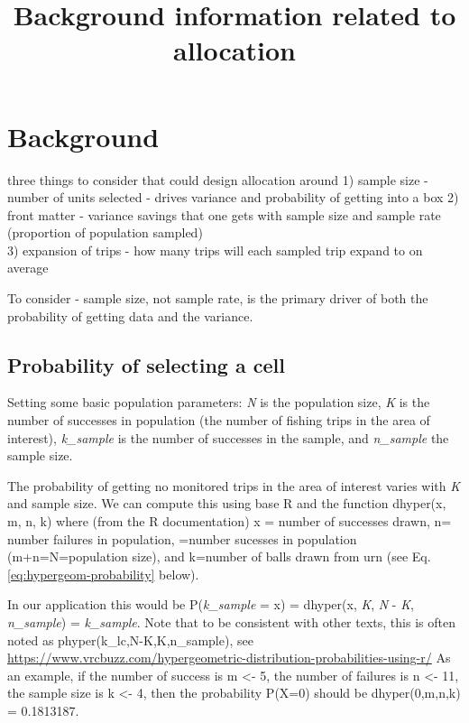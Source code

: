 \documentclass[
]{article}
\title{Background information related to allocation}
\author{}
\date{\vspace{-2.5em}}
\begin{document}
\maketitle

{
\setcounter{tocdepth}{2}
\tableofcontents
}
\hypertarget{background}{%
\section{Background}\label{background}}

three things to consider that could design allocation around
1) sample size - number of units selected - drives variance and probability of
getting into a box
2) front matter - variance savings that one gets with sample size and sample
rate (proportion of population sampled)\\
3) expansion of trips - how many trips will each sampled trip expand to on
average

To consider -
sample size, not sample rate, is the primary driver of both the probability of
getting data and the variance.

\hypertarget{probability-of-selecting-a-cell}{%
\subsection{Probability of selecting a cell}\label{probability-of-selecting-a-cell}}

Setting some basic population parameters: \emph{N} is the population size, \emph{K}
is the number of successes in population (the number of fishing trips in the
area of interest), \emph{k\_sample} is the number of successes in the sample, and
\emph{n\_sample} the sample size.

The probability of getting no monitored trips in the area of interest varies
with \emph{K} and sample size. We can compute this using base R and the function
dhyper(x, m, n, k) where (from the R documentation) x = number of successes
drawn, n= number failures in population, =number sucesses in population
(m+n=N=population size), and k=number of balls drawn from urn (see Eq.
\eqref{eq:hypergeom-probability} below).

In our application this would be P(\emph{k\_sample} = x) = dhyper(x, \emph{K}, \emph{N} - \emph{K},
\emph{n\_sample}) = \emph{k\_sample}. Note that to be consistent with other texts, this
is often noted as phyper(k\_lc,N-K,K,n\_sample),
see \url{https://www.vrcbuzz.com/hypergeometric-distribution-probabilities-using-r/}
As an example, if the number of success is m \textless- 5, the number of
failures is n \textless- 11, the sample size is k \textless- 4, then the probability
P(X=0) should be dhyper(0,m,n,k) = 0.1813187.
\end{document}
